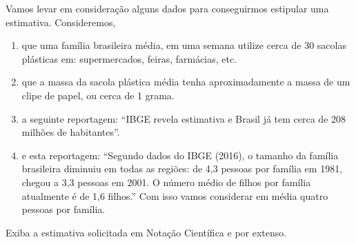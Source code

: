 Vamos levar em consideração alguns dados para conseguirmos estipular uma estimativa. Consideremos,
\begin{enumerate}
\item {} 
que uma família brasileira média, em uma semana utilize cerca de 30 sacolas plásticas em: supermercados, feiras, farmácias, etc.

\item {} 
que a massa da sacola plástica média tenha aproximadamente a massa de um clipe de papel, ou cerca de 1 grama.

\item {} 
a seguinte reportagem: “IBGE revela estimativa e Brasil já tem cerca de 208 milhões de habitantes”.

\item {} 
e esta reportagem: “Segundo dados do IBGE (2016), o tamanho da família brasileira diminuiu em todas as regiões: de 4,3 pessoas por família em 1981, chegou a 3,3 pessoas em 2001. O número médio de filhos por família atualmente é de 1,6 filhos.” Com isso vamos considerar em média quatro pessoas por família.

\end{enumerate}

Exiba a estimativa solicitada em Notação Científica e por extenso.

